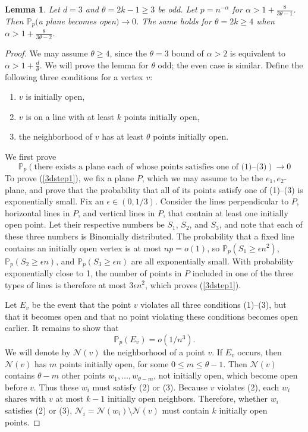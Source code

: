 \documentclass{amsart}
\newcommand{\prob}{\mathbb{P}}
\newcommand{\threshold}{\theta}
\numberwithin{equation}{section}
\newtheorem{lemma}[theorem]{Lemma}
\theoremstyle{definition}
\theoremstyle{remark}
\begin{document}
\begin{lemma}\label{d3upperbound}
Let $d=3$ and $\theta=2k-1 \ge 3$ be odd. Let $p = n^{-\alpha}$ for $\alpha > 1 + \frac{8}{3\theta-1}$. Then $\prob_p($a plane becomes open$)\to 0$. 
The same holds for $\theta=2k \ge 4$ when $\alpha > 1 + \frac{8}{3\theta-2}$.
\end{lemma}
\begin{proof}
We may assume $\threshold \geq 4$, since the $\threshold = 3$ bound of $\alpha > 2$ is equivalent to $\alpha>1 + \frac{d}{\threshold}$.  We will prove the lemma for $\threshold$ odd; the even case is similar.  Define the following three conditions for a vertex $v$:
\begin{enumerate}
\item $v$ is initially open,
\item $v$ is on a line with at least $k$ points initially open,
\item the neighborhood of $v$ has at least $\theta$ points initially open.
\end{enumerate}

We first prove 
\begin{equation}
\label{3dstep1}
\prob_p(\text{there exists a plane each of whose points satisfies one of (1)--(3)})\to 0
\end{equation}
To prove (\ref{3dstep1}), we fix a plane $P$, which we may assume to be the $e_1,e_2$-plane, 
and prove that the probability that 
all of its points satisfy one of (1)--(3)
is exponentially small. Fix an $\epsilon\in(0,1/3)$. 
Consider the lines perpendicular to $P$, horizontal lines
in $P$, and vertical lines in $P$, that contain at least one initially open point. 
Let their respective numbers be $S_1$, $S_2$, and $S_3$, and note that each of these
three numbers is Binomially distributed.  The probability that a fixed line 
contains an initially open vertex is at most $np=o(1)$, so $\prob_p(S_1\ge \epsilon n^2)$,
 $\prob_p(S_2\ge \epsilon n)$, and
 $\prob_p(S_3\ge \epsilon n)$ are all exponentially small. With probability exponentially 
close to 1, the number of points in $P$ included in one of the three types of lines is therefore 
at most $3\epsilon n^2$, which proves (\ref{3dstep1}).

Let $E_v$ be the event that the point $v$ violates all three conditions (1)--(3), 
but that it becomes open and that no point violating these conditions becomes 
open earlier.  It remains to show that 
\begin{equation}
\label{3dstep2}
\prob_p(E_v)=o(1/n^3).
\end{equation}
We will denote by $\mathcal{N}(v)$ the neighborhood of a point $v$. 
If $E_v$ occurs, then $\mathcal{N}(v)$ has $m$ points initially open, for some 
$0 \le m \le \theta - 1$. Then $\mathcal{N}(v)$ contains $\theta-m$ other points 
$w_1, \ldots, w_{\theta-m}$, not initially open, which become open before $v$. 
Thus these $w_i$  must satisfy (2) or (3). 
Because $v$ violates (2), each $w_i$ shares with $v$ at most $k-1$ initially open neighbors. 
Therefore, whether $w_i$ satisfies (2) or (3),
 $\mathcal N_i=\mathcal{N}(w_i) \setminus\mathcal{N}(v)$ must contain
$k$ initially open points.


\end{proof}
\end{document}
